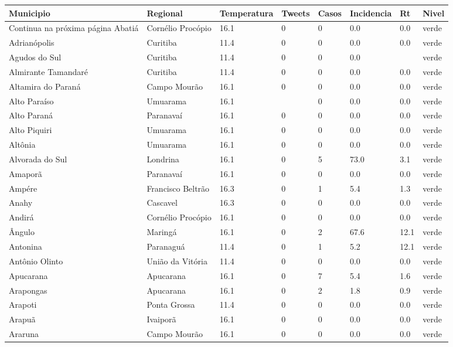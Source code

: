 \begin{longtable}{l|lllllll}
  \hline
Municipio & Regional & Temperatura & Tweets & Casos & Incidencia & Rt & Nivel \\ 
  \hline
\endhead
\hline
{\footnotesize Continua na próxima página}
\endfoot
\endlastfoot
Abatiá & Cornélio Procópio & 16.1 & 0 & 0 & 0.0 & 0.0 & verde \\ 
  Adrianópolis & Curitiba & 11.4 & 0 & 0 & 0.0 & 0.0 & verde \\ 
  Agudos do Sul & Curitiba & 11.4 & 0 & 0 & 0.0 &  & verde \\ 
  Almirante Tamandaré & Curitiba & 11.4 & 0 & 0 & 0.0 & 0.0 & verde \\ 
  Altamira do Paraná & Campo Mourão & 16.1 & 0 & 0 & 0.0 & 0.0 & verde \\ 
  Alto Paraíso & Umuarama & 16.1 &  & 0 & 0.0 & 0.0 & verde \\ 
  Alto Paraná & Paranavaí & 16.1 & 0 & 0 & 0.0 & 0.0 & verde \\ 
  Alto Piquiri & Umuarama & 16.1 & 0 & 0 & 0.0 & 0.0 & verde \\ 
  Altônia & Umuarama & 16.1 & 0 & 0 & 0.0 & 0.0 & verde \\ 
  Alvorada do Sul & Londrina & 16.1 & 0 & 5 & 73.0 & 3.1 & verde \\ 
  Amaporã & Paranavaí & 16.1 & 0 & 0 & 0.0 & 0.0 & verde \\ 
  Ampére & Francisco Beltrão & 16.3 & 0 & 1 & 5.4 & 1.3 & verde \\ 
  Anahy & Cascavel & 16.3 & 0 & 0 & 0.0 & 0.0 & verde \\ 
  Andirá & Cornélio Procópio & 16.1 & 0 & 0 & 0.0 & 0.0 & verde \\ 
  Ângulo & Maringá & 16.1 & 0 & 2 & 67.6 & 12.1 & verde \\ 
  Antonina & Paranaguá & 11.4 & 0 & 1 & 5.2 & 12.1 & verde \\ 
  Antônio Olinto & União da Vitória & 11.4 & 0 & 0 & 0.0 & 0.0 & verde \\ 
  Apucarana & Apucarana & 16.1 & 0 & 7 & 5.4 & 1.6 & verde \\ 
  Arapongas & Apucarana & 16.1 & 0 & 2 & 1.8 & 0.9 & verde \\ 
  Arapoti & Ponta Grossa & 11.4 & 0 & 0 & 0.0 & 0.0 & verde \\ 
  Arapuã & Ivaiporã & 16.1 & 0 & 0 & 0.0 & 0.0 & verde \\ 
  Araruna & Campo Mourão & 16.1 & 0 & 0 & 0.0 & 0.0 & verde \\ 

\end{longtable}
